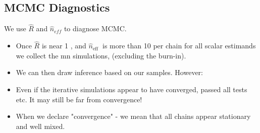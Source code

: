 \subsection{MCMC Diagnostics}
We use $\hat{R}$ and $\hat{n}_{eff}$ to diagnose MCMC.
\begin{itemize}
    \item Once $\hat{R}$ is near 1 , and $\hat{n}_{\text {eff }}$ is more than 10 per chain for all scalar estimands we collect the mn simulations, (excluding the burn-in).
    \item We can then draw inference based on our samples. However:
    \item Even if the iterative simulations appear to have converged, passed all tests etc. It may still be far from convergence!
    \item When we declare "convergence" - we mean that all chains appear stationary and well mixed.
\end{itemize}